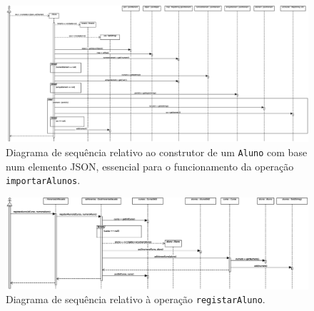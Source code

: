 \documentclass[12pt, a4paper]{article}
\begin{document}
\begin{landscape}
        \vspace*{\fill}
        \pagebreak
        \vspace*{\fill}

        \begin{figure}[H]
            \centering
            \includegraphics[scale=0.45]{Imagens/Modelos/importarAlunosConstrutorDAO.svg.eps}
            \caption{
                Diagrama de sequência relativo ao construtor de um \texttt{Aluno} com base num
                elemento JSON, essencial para o funcionamento da operação \texttt{importarAlunos}.
            }
        \end{figure}

        \vspace*{\fill}
        \pagebreak
        \vspace*{\fill}

        \begin{figure}[H]
            \centering
            \includegraphics[scale=0.60]{Imagens/Modelos/registarAlunoDAO.svg.eps}
            \caption{
                Diagrama de sequência relativo à operação \texttt{registarAluno}.
            }
        \end{figure}

        \vspace*{\fill}
        \pagebreak
        \vspace*{\fill}


\end{landscape}
\end{document}
